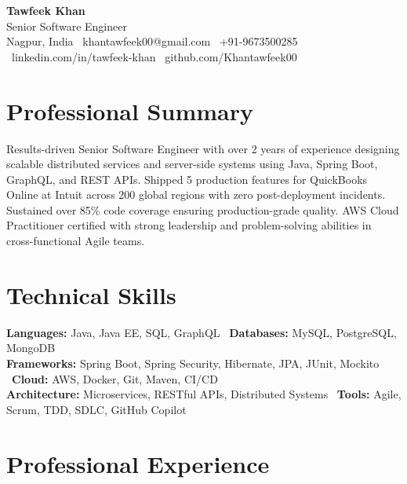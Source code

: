 \documentclass[10pt, letterpaper]{article}
\begin{document}
\begin{center}
    {\huge \textbf{Tawfeek Khan}} \\[2pt]
    {\small Senior Software Engineer} \\[2pt]
    \small
    Nagpur, India \textbar\
    khantawfeek00@gmail.com \textbar\
    +91-9673500285 \textbar\
    linkedin.com/in/tawfeek-khan \textbar\
    github.com/Khantawfeek00
\end{center}

\section{Professional Summary}
Results-driven Senior Software Engineer with over 2 years of experience designing scalable distributed services and server-side systems using Java, Spring Boot, GraphQL, and REST APIs. Shipped 5 production features for QuickBooks Online at Intuit across 200 global regions with zero post-deployment incidents. Sustained over 85\% code coverage ensuring production-grade quality. AWS Cloud Practitioner certified with strong leadership and problem-solving abilities in cross-functional Agile teams.

\section{Technical Skills}
\textbf{Languages:} Java, Java EE, SQL, GraphQL \textbar\ \textbf{Databases:} MySQL, PostgreSQL, MongoDB \\
\textbf{Frameworks:} Spring Boot, Spring Security, Hibernate, JPA, JUnit, Mockito \textbar\ \textbf{Cloud:} AWS, Docker, Git, Maven, CI/CD \\
\textbf{Architecture:} Microservices, RESTful APIs, Distributed Systems \textbar\ \textbf{Tools:} Agile, Scrum, TDD, SDLC, GitHub Copilot

\section{Professional Experience}
\end{document}
